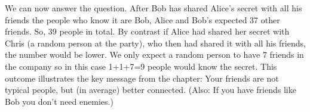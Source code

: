 We can now answer the question. After Bob has shared Alice's secret with all his friends the people who know it are Bob, Alice and Bob's expected 37 other friends. So, 39 people in total. By contrast if Alice had shared her secret with Chris (a random person at the party), who then had shared it with all his friends, the number would be lower. We only expect a random person to have 7 friends in the company so in this case 1+1+7=9 people would know the secret. This outcome illustrates the key message from the chapter: Your friends are not typical people, but (in average) better connected. (Also: If you have friends like Bob you don't need enemies.)